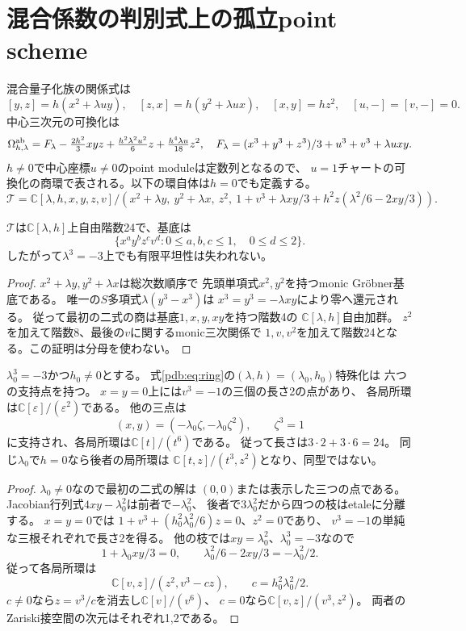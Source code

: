 \section{混合係数の判別式上の孤立point scheme}
\label{pdb:sec}
混合量子化族の関係式は
\[
[y,z]=h(x^2+\lambda uy),\quad[z,x]=h(y^2+\lambda ux),
\quad[x,y]=hz^2,\quad [u,-]=[v,-]=0.
\]
中心三次元の可換化は
\[
\Omega_{h,\lambda}^{\rm ab}
=F_\lambda-\tfrac{2h^2}{3}xyz+\tfrac{h^2\lambda^2u^2}{6}z
 +\tfrac{h^4\lambda u}{18}z^2,\quad
F_\lambda=(x^3+y^3+z^3)/3+u^3+v^3+\lambda uxy.
\]
$h\ne0$で中心座標$u\ne0$のpoint moduleは定数列となるので、
$u=1$チャートの可換化の商環で表される。以下の環自体は$h=0$でも定義する。
\begin{equation}
\mathcal T=\mathbb C[\lambda,h,x,y,z,v]/
(x^2+\lambda y,\ y^2+\lambda x,\ z^2,\
1+v^3+\lambda xy/3+h^2z(\lambda^2/6-2xy/3)).
\label{pdb:eq:ring}
\end{equation}

\begin{theorem}[判別式を越える有限自由性]\label{pdb:thm:flat}
$\mathcal T$は$\mathbb C[\lambda,h]$上自由階数24で、基底は
\[
\{x^ay^bz^cv^d:0\le a,b,c\le1,\quad0\le d\le2\}.
\]
したがって$\lambda^3=-3$上でも有限平坦性は失われない。
\end{theorem}
\begin{proof}
$x^2+\lambda y,y^2+\lambda x$は総次数順序で
先頭単項式$x^2,y^2$を持つmonic Gr\"obner基底である。
唯一の$S$多項式$\lambda(y^3-x^3)$は
$x^3=y^3=-\lambda xy$により零へ還元される。
従って最初の二式の商は基底$1,x,y,xy$を持つ階数4の
$\mathbb C[\lambda,h]$自由加群。
$z^2$を加えて階数8、最後の$v$に関するmonic三次関係で
$1,v,v^2$を加えて階数24となる。この証明は分母を使わない。
\end{proof}

\begin{theorem}[三個の二重点と三個の六重点]\label{pdb:thm:sixfold}
$\lambda_0^3=-3$かつ$h_0\ne0$とする。
式\eqref{pdb:eq:ring}の$(\lambda,h)=(\lambda_0,h_0)$特殊化は
六つの支持点を持つ。
$x=y=0$上には$v^3=-1$の三個の長さ2の点があり、
各局所環は$\mathbb C[\varepsilon]/(\varepsilon^2)$である。
他の三点は
\[
 (x,y)=(-\lambda_0\zeta,-\lambda_0\zeta^2),\qquad \zeta^3=1
\]
に支持され、各局所環は$\mathbb C[t]/(t^6)$である。
従って長さは$3\cdot2+3\cdot6=24$。
同じ$\lambda_0$で$h=0$なら後者の局所環は
$\mathbb C[t,z]/(t^3,z^2)$となり、同型ではない。
\end{theorem}
\begin{proof}
$\lambda_0\ne0$なので最初の二式の解は
$(0,0)$または表示した三つの点である。
Jacobian行列式$4xy-\lambda_0^2$は前者で$-\lambda_0^2$、
後者で$3\lambda_0^2$だから四つの枝はetaleに分離する。
$x=y=0$では
$1+v^3+(h_0^2\lambda_0^2/6)z=0$、$z^2=0$であり、
$v^3=-1$の単純な三根それぞれで長さ2を得る。
他の枝では$xy=\lambda_0^2$、$\lambda_0^3=-3$なので
\[
 1+\lambda_0xy/3=0,\qquad
 \lambda_0^2/6-2xy/3=-\lambda_0^2/2.
\]
従って各局所環は
\[
 \mathbb C[v,z]/(z^2,v^3-cz),\qquad c=h_0^2\lambda_0^2/2.
\]
$c\ne0$なら$z=v^3/c$を消去し$\mathbb C[v]/(v^6)$、
$c=0$なら$\mathbb C[v,z]/(v^3,z^2)$。
両者のZariski接空間の次元はそれぞれ1,2である。
\end{proof}

